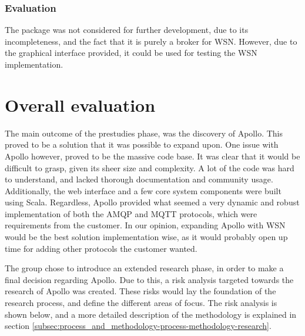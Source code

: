 \subsubsection{Evaluation}
\label{subsec:prestudies-existing_solutions-micro_wsn_and_nffiplayer-evaluation}

The package was not considered for further development, due to its incompleteness, and the fact that it is purely a broker for WSN. However, due to the graphical interface provided, it could be used for testing the WSN implementation.

\section{Overall evaluation}
\label{sec:prestudies-overall_evaluation}

The main outcome of the prestudies phase, was the discovery of Apollo. This proved to be a solution that it was possible to expand upon. One issue with Apollo however, proved to be the massive code base. It was clear that it would be difficult to grasp, given its sheer size and complexity. A lot of the code was hard to understand, and lacked thorough documentation and community usage. Additionally, the web interface and a few core system components were built using Scala. Regardless, Apollo provided what seemed a very dynamic and robust implementation of both the AMQP and MQTT protocols, which were requirements from the customer. In our opinion, expanding Apollo with WSN would be the best solution implementation wise, as it would probably open up time for adding other protocols the customer wanted.

The group chose to introduce an extended research phase, in order to make a final decision regarding Apollo. Due to this, a risk analysis targeted towards the research of Apollo was created. These risks would lay the foundation of the research process, and define the different areas of focus. The risk analysis is shown below, and a more detailed description of the methodology is explained in section \ref{subsec:process_and_methodology-process-methodology-research}.


